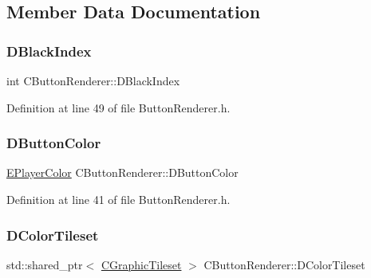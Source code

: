 \subsection{Member Data Documentation}
\hypertarget{classCButtonRenderer_ac5306adba14177b75998e4ffc79a7295}{}\label{classCButtonRenderer_ac5306adba14177b75998e4ffc79a7295} 
\subsubsection{\texorpdfstring{D\+Black\+Index}{DBlackIndex}}
{\footnotesize\ttfamily int C\+Button\+Renderer\+::\+D\+Black\+Index\hspace{0.3cm}{\ttfamily [protected]}}



Definition at line 49 of file Button\+Renderer.\+h.

\hypertarget{classCButtonRenderer_a8b2bce7400657eb1a8f896b070d11996}{}\label{classCButtonRenderer_a8b2bce7400657eb1a8f896b070d11996} 
\subsubsection{\texorpdfstring{D\+Button\+Color}{DButtonColor}}
{\footnotesize\ttfamily \hyperlink{GameDataTypes_8h_aafb0ca75933357ff28a6d7efbdd7602f}{E\+Player\+Color} C\+Button\+Renderer\+::\+D\+Button\+Color\hspace{0.3cm}{\ttfamily [protected]}}



Definition at line 41 of file Button\+Renderer.\+h.

\hypertarget{classCButtonRenderer_aa823ae99f3642927241c085963888128}{}\label{classCButtonRenderer_aa823ae99f3642927241c085963888128} 
\subsubsection{\texorpdfstring{D\+Color\+Tileset}{DColorTileset}}
{\footnotesize\ttfamily std\+::shared\+\_\+ptr$<$ \hyperlink{classCGraphicTileset}{C\+Graphic\+Tileset} $>$ C\+Button\+Renderer\+::\+D\+Color\+Tileset\hspace{0.3cm}{\ttfamily [protected]}}



